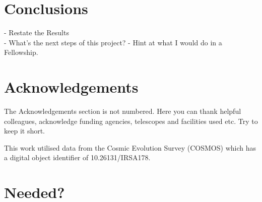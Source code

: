 \documentclass[fleqn,usenatbib]{mnras}
\begin{document}
\section{Conclusions}\label{conclusion}
 - Restate the Results \\
 - What's the next steps of this project?
    - Hint at what I would do in a Fellowship.
 
\section*{Acknowledgements}
The Acknowledgements section is not numbered. Here you can thank helpful
colleagues, acknowledge funding agencies, telescopes and facilities used etc.
Try to keep it short.

This work utilised data from the Cosmic Evolution Survey (COSMOS) which has a digital object identifier of 10.26131/IRSA178.








\appendix

\section{Needed?}




\bsp	%
\label{lastpage}
\end{document}
